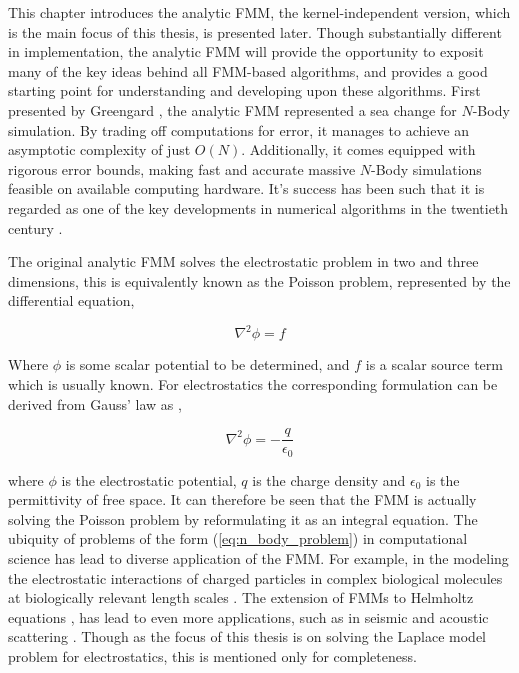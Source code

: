 This chapter introduces the analytic \gls{FMM}, the kernel-independent
version, which is the main focus of this thesis, is presented later.
Though substantially different in implementation, the analytic FMM will provide the opportunity
to exposit many of the key ideas behind all FMM-based algorithms, and provides
a good starting point for understanding and developing upon these algorithms.
First presented by Greengard \cite{Greengard:1987:Yale},
the analytic \gls{FMM} represented a sea change for $N$-Body simulation. By
trading off computations for error, it manages to achieve an asymptotic complexity
 of just $O(N)$. Additionally, it comes equipped with rigorous error bounds,
making fast and accurate massive $N$-Body simulations feasible on available
computing hardware. It's success has been such that it is regarded as one of
the key developments in numerical algorithms in the twentieth century \cite{Cipra:2000:SN}.

The original analytic FMM solves the electrostatic problem
in two and three dimensions, this is equivalently known as the Poisson problem,
represented by the differential equation,

\begin{equation}
    \nabla^2 \phi =f
\label{eq:poisson}
\end{equation}

Where $\phi$ is some scalar potential to be determined, and $f$ is a scalar source
term which is usually known. For electrostatics the corresponding formulation
can be derived from Gauss' law as \cite{Griffiths:2017:CUP},

\begin{equation}
  \nabla^2 \phi = - \frac{q}{\epsilon_0}
\label{eq:electrostatic_poisson}
\end{equation}

where $\phi$ is the electrostatic potential, $q$ is the charge density and
$\epsilon_0$ is the permittivity of free space. It can therefore be seen that
the \gls{FMM} is actually solving the Poisson problem by reformulating it as an
integral equation. The ubiquity of problems of the form (\ref{eq:n_body_problem})
in computational science has lead to diverse application of the FMM. For example,
in the modeling the electrostatic interactions of charged particles in complex
biological molecules at biologically relevant length scales \cite{Board:1992:CPL}.
The extension of FMMs to Helmholtz equations \cite{Rokhlin:1990:JCP}, has lead
to even more applications, such as in seismic and acoustic scattering
\cite{Hwu:2011:MKP}. Though as the focus of this thesis is on solving the Laplace
model problem for electrostatics, this is mentioned only for completeness.

